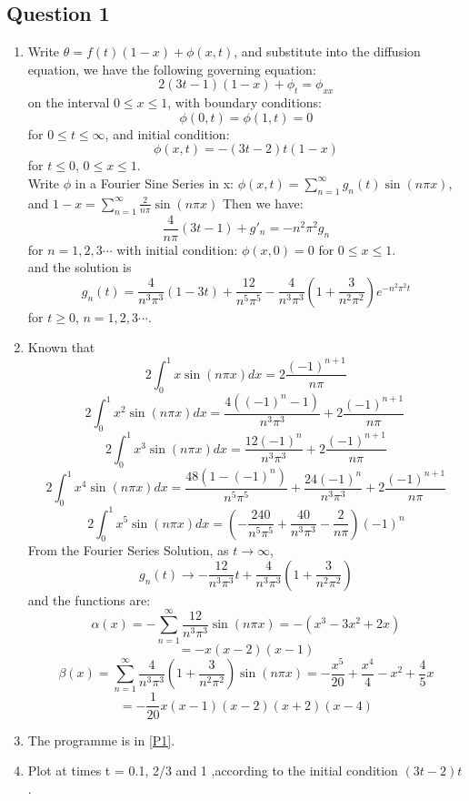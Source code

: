 \documentclass[a4paper,11pt]{article}
\begin{document}
\subsection*{Question 1}
\begin{enumerate}[label = (\roman*)]
  \item 
  Write $\theta = f(t)(1-x)+\phi(x,t)$, and substitute into the diffusion equation, we have the following governing equation:
  $$2(3t-1)(1-x) + \phi_{t} = \phi_{xx}$$on the interval $0 \leqslant x \leqslant 1$, with boundary conditions:\\
  $$\phi(0,t) = \phi(1,t) = 0$$ for $0 \leqslant t \leqslant \infty$, and initial condition:
  $$\phi(x, t) = -(3t-2)t(1-x) $$ for $t\leqslant 0$, $0 \leqslant x \leqslant 1$.\\
  Write $\phi$ in a Fourier Sine Series in x: $\phi(x,t) = \sum_{n=1}^{\infty}g_{n}(t) \sin(n\pi x)$, and $1-x = \sum_{n=1}^{\infty}\frac{2}{n\pi}\sin(n \pi x)$
  Then we have:
  $$\frac{4}{n \pi}(3t-1)+ g'_{n} = -n^{2}\pi^{2} g_{n}$$
  for $n = 1,2,3 \cdots$ with initial condition:
$\phi(x, 0) = 0$ for $0 \leqslant x \leqslant 1$.\\
  and the solution is 
$$g_{n}(t) = \frac{4}{n^3 {\pi}^3} (1-3t) + \frac{12}{n^5 {\pi}^5} -\frac{4}{n^3 {\pi}^3}(1+\frac{3}{n^2 {\pi}^2})e^{-n^2 {\pi}^2 t}$$ 
for $t \geqslant 0$, $n = 1,2,3 \cdots$.
  \item
  Known that $$2\int_{0}^{1}x\sin(n\pi x) dx = 2\frac{(-1)^{n+1}}{n \pi}$$
   $$ 2\int_{0}^{1}x^2\sin(n\pi x) dx = \frac{4((-1)^{n} - 1)}{n^3 \pi^3} + 2\frac{(-1)^{n+1}}{n \pi}\
   $$
   $$ 2\int_{0}^{1}x^3\sin(n\pi x) dx = \frac{12(-1)^{n}}{n^3 \pi^3} +2\frac{(-1)^{n+1}}{n \pi}
   $$
   $$ 2\int_{0}^{1}x^4\sin(n\pi x) dx =  \frac{48(1-(-1)^{n})}{n^5 \pi^5} +\frac{24(-1)^{n}}{n^3 \pi^3} +2\frac{(-1)^{n+1}}{n \pi}
   $$
   $$ 2\int_{0}^{1}x^5\sin(n\pi x) dx =  (-\frac{240}{n^5 \pi^5}+\frac{40}{n^3 \pi^3} -\frac{2}{n \pi})(-1)^{n}
   $$
  From the Fourier Series Solution, as $t\to \infty$, $$g_{n}(t) \to -\frac{12}{n^3 \pi^3}t + \frac{4}{n^3 {\pi}^3}(1+\frac{3}{n^2 {\pi}^2})$$ and the functions are:
  $$ \alpha (x) = - \sum_{n=1}^{\infty} \frac{12}{n^3 \pi^3}\sin(n\pi x) = -(x^3 - 3x^2 +2x) $$
  $$= -x(x-2)(x-1)$$
 $$ \beta(x) = \sum_{n=1}^{\infty}  \frac{4}{n^3 {\pi}^3}(1+\frac{3}{n^2 {\pi}^2})\sin(n\pi x) = -\frac{x^5}{20} +\frac{x^4}{4}-x^2+\frac{4}{5}x$$
 $$= -\frac{1}{20}x(x-1)(x-2)(x+2)(x-4)$$
 \item 
 The programme is in \ref{P1}.
 \item
 Plot at times t = 0.1, 2/3 and 1 ,according to the initial condition $(3t-2)t$.

\end{enumerate}
\end{document}
